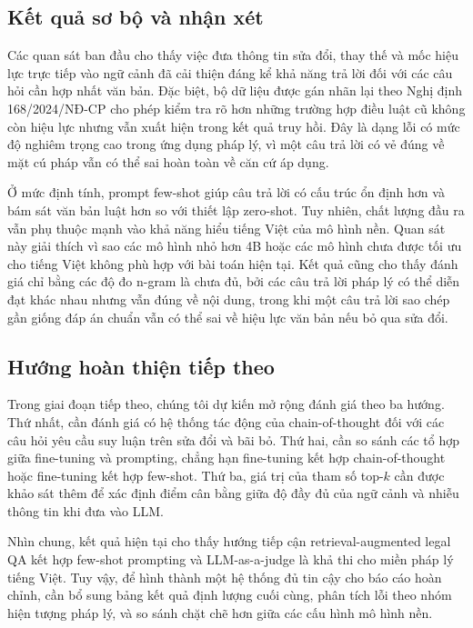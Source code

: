 \subsection{Kết quả sơ bộ và nhận xét}
Các quan sát ban đầu cho thấy việc đưa thông tin sửa đổi, thay thế và mốc hiệu lực trực tiếp vào ngữ cảnh đã cải thiện đáng kể khả năng trả lời đối với các câu hỏi cần hợp nhất văn bản. Đặc biệt, bộ dữ liệu được gán nhãn lại theo Nghị định 168/2024/NĐ-CP cho phép kiểm tra rõ hơn những trường hợp điều luật cũ không còn hiệu lực nhưng vẫn xuất hiện trong kết quả truy hồi. Đây là dạng lỗi có mức độ nghiêm trọng cao trong ứng dụng pháp lý, vì một câu trả lời có vẻ đúng về mặt cú pháp vẫn có thể sai hoàn toàn về căn cứ áp dụng.

Ở mức định tính, prompt few-shot giúp câu trả lời có cấu trúc ổn định hơn và bám sát văn bản luật hơn so với thiết lập zero-shot. Tuy nhiên, chất lượng đầu ra vẫn phụ thuộc mạnh vào khả năng hiểu tiếng Việt của mô hình nền. Quan sát này giải thích vì sao các mô hình nhỏ hơn 4B hoặc các mô hình chưa được tối ưu cho tiếng Việt không phù hợp với bài toán hiện tại. Kết quả cũng cho thấy đánh giá chỉ bằng các độ đo n-gram là chưa đủ, bởi các câu trả lời pháp lý có thể diễn đạt khác nhau nhưng vẫn đúng về nội dung, trong khi một câu trả lời sao chép gần giống đáp án chuẩn vẫn có thể sai về hiệu lực văn bản nếu bỏ qua sửa đổi.

\subsection{Hướng hoàn thiện tiếp theo}
Trong giai đoạn tiếp theo, chúng tôi dự kiến mở rộng đánh giá theo ba hướng. Thứ nhất, cần đánh giá có hệ thống tác động của chain-of-thought đối với các câu hỏi yêu cầu suy luận trên sửa đổi và bãi bỏ. Thứ hai, cần so sánh các tổ hợp giữa fine-tuning và prompting, chẳng hạn fine-tuning kết hợp chain-of-thought hoặc fine-tuning kết hợp few-shot. Thứ ba, giá trị của tham số top-$k$ cần được khảo sát thêm để xác định điểm cân bằng giữa độ đầy đủ của ngữ cảnh và nhiễu thông tin khi đưa vào LLM.

Nhìn chung, kết quả hiện tại cho thấy hướng tiếp cận retrieval-augmented legal QA kết hợp few-shot prompting và LLM-as-a-judge là khả thi cho miền pháp lý tiếng Việt. Tuy vậy, để hình thành một hệ thống đủ tin cậy cho báo cáo hoàn chỉnh, cần bổ sung bảng kết quả định lượng cuối cùng, phân tích lỗi theo nhóm hiện tượng pháp lý, và so sánh chặt chẽ hơn giữa các cấu hình mô hình nền.
